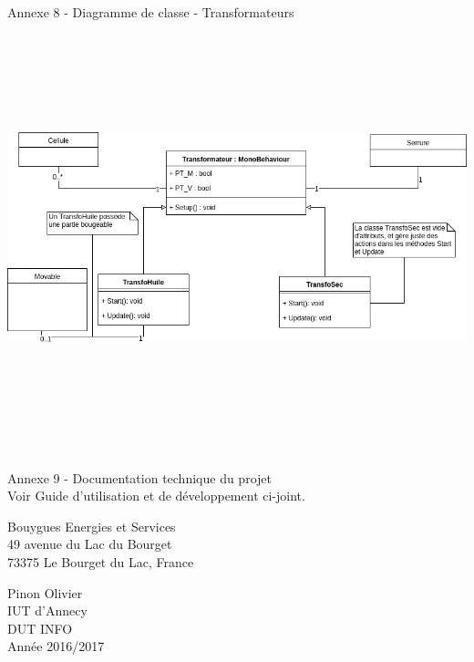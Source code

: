 \documentclass[a4paper]{article}
\begin{document}
    \vfill
    \huge Annexe 8 - Diagramme de classe - Transformateurs \\
    \vspace{20pt}
    \includegraphics[width=16.5cm,height=12.5cm]{img/DiagClassTransformateur}
    \vfill

    \huge Annexe 9 - Documentation technique du projet \\
    \vspace{15pt}
    \normalsize Voir Guide d'utilisation et de développement ci-joint.

    \vfill 

    \normalsize
    \newpage 
    \thispagestyle{empty}
    \noindent
    \begin{minipage}{.49\textwidth}
        Bouygues Energies et Services \\
        49 avenue du Lac du Bourget \\
        73375 Le Bourget du Lac, France
    \end{minipage}
    \begin{minipage}{.49\textwidth}
    \begin{flushright}
        Pinon Olivier \\
        IUT d'Annecy \\
        DUT INFO \\
        Année 2016/2017 \\
    \end{flushright}
    \end{minipage}
\end{document}
